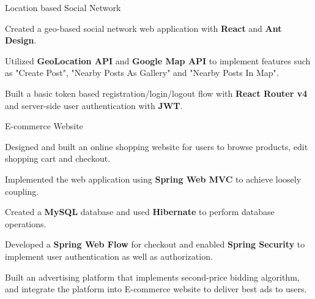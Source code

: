 \begin{cvsimpleprojects}
  \cvsimpleproject
    {Location based Social Network}
    {
      \begin{cvitems}
        \item {Created a geo-based social network web application with \textbf{React} and \textbf{Ant Design}.}
        \item {Utilized \textbf{GeoLocation API} and \textbf{Google Map API} to implement features such as "Create Post", "Nearby Posts As Gallery" and "Nearby Posts In Map".}
        \item {Built a basic token based registration/login/logout flow with \textbf{React Router v4} and server-side user authentication with \textbf{JWT}.}
      \end{cvitems}
    }
    
    
    
    \cvsimpleproject
    {E-commerce Website}
    {
      \begin{cvitems}
        \item {Designed and built an online shopping website for users to browse products, edit shopping cart and checkout.}
        \item {Implemented the web application using \textbf{Spring Web MVC} to achieve loosely coupling. }
        \item {Created a \textbf{MySQL} database and used \textbf{Hibernate} to perform database operations.}
        \item {Developed a \textbf{Spring Web Flow} for checkout and enabled \textbf{Spring Security} to implement user authentication as well as authorization.}
        \item {Built an advertising platform that implements second-price bidding algorithm, and integrate the platform into E-commerce website to deliver best ads to users.}
      \end{cvitems}
    }
    
    
    
    

\end{cvsimpleprojects}
